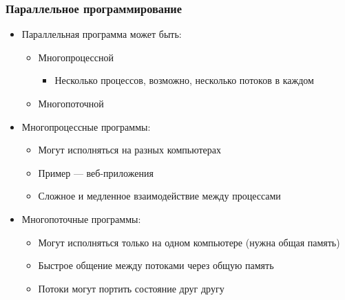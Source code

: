 \documentclass[xetex,mathserif,serif]{beamer}
\begin{document}
    \begin{frame}
        \frametitle{Параллельное программирование}
        \begin{itemize}
            \item Параллельная программа может быть:
            \begin{itemize}
                \item Многопроцессной
                \begin{itemize}
                    \item Несколько процессов, возможно, несколько потоков в каждом
                \end{itemize}
                \item Многопоточной
            \end{itemize}
            \item Многопроцессные программы:
            \begin{itemize}
                \item Могут исполняться на разных компьютерах
                \item Пример --- веб-приложения
                \item Сложное и медленное взаимодействие между процессами
            \end{itemize}
            \item Многопоточные программы:
            \begin{itemize}
                \item Могут исполняться только на одном компьютере (нужна общая память)
                \item Быстрое общение между потоками через общую память
                \item Потоки могут портить состояние друг другу
            \end{itemize}
        \end{itemize}
    \end{frame}
\end{document}
